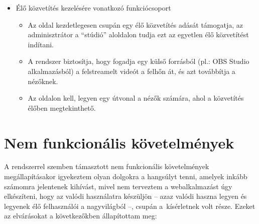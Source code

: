 \begin{itemize}
  \item Élő közvetítés kezelésére vonatkozó funkciócsoport
        \begin{itemize}
          \item Az oldal kezdetlegesen csupán egy élő közvetítés adását támogatja, az adminisztrátor a ``stúdió'' aloldalon tudja ezt az egyetlen élő közvetítést indítani.
          \item A rendszer biztosítja, hogy fogadja egy külső forrásból (pl.: OBS Studio alkalmazásból) a felstreamelt videót a felhőn át, és azt továbbítja a nézőknek.
          \item Az oldalon kell, legyen egy útvonal a nézők számára, ahol a közvetítés élőben megtekinthető.
        \end{itemize}
\end{itemize}

\section{Nem funkcionális követelmények}

A rendszerrel szemben támasztott nem funkcionális követelmények megállapításakor igyekeztem olyan dolgokra a hangsúlyt tenni, amelyek inkább számomra jelentenek kihívást, mivel nem terveztem a webalkalmazást úgy elkészíteni, hogy az valódi használatra készüljön -- azaz valódi haszna legyen és legyenek élő felhasználói a nagyvilágból --, csupán a~kísérletnek volt része. Ezeket az elvárásokat a következőkben állapítottam meg:

